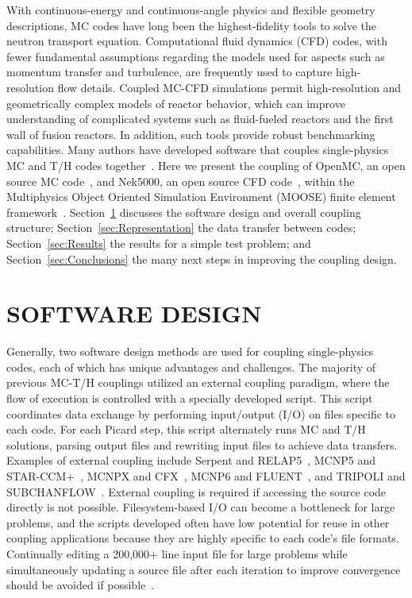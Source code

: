 \documentclass[letterpaper]{physor2018}
\begin{document}
With continuous-energy and continuous-angle physics and flexible geometry descriptions, MC
codes have long been the highest-fidelity tools to solve the neutron transport
equation. Computational fluid dynamics (CFD) codes, with fewer fundamental
assumptions regarding the models used for aspects such as momentum transfer and
turbulence, are frequently used to capture high-resolution flow details.
Coupled MC-CFD simulations permit high-resolution and geometrically complex
models of reactor behavior, which can improve understanding of complicated
systems such as fluid-fueled reactors and the first wall of fusion reactors. In
addition, such tools provide robust benchmarking capabilities.  Many authors
have developed software that couples single-physics MC and T/H codes
together~\cite{Wu,Seker,Cardoni,Breitkreutz,Sjenitzer,Gurecky,Ivanov,Daeubler,Aufiero,Gill}. Here we
present the coupling of OpenMC, an open source MC code~\cite{Romano}, and
Nek5000, an open source CFD code~\cite{Fischer}, within the Multiphysics Object Oriented
Simulation Environment (MOOSE) finite element framework~\cite{Gaston}.
Section~\ref{sec:first} discusses the software design and overall coupling
structure; Section~\ref{sec:Representation} the data transfer between codes;
Section~\ref{sec:Results} the results for a simple test problem; and
Section~\ref{sec:Conclusions} the many next steps in improving the coupling
design.

\section{SOFTWARE DESIGN}
\label{sec:first}

Generally, two software design methods are used for coupling single-physics codes,
each of which has unique advantages and challenges.
The majority of previous MC-T/H couplings utilized
an external coupling paradigm, where the flow of execution is controlled with a specially developed script.
This script coordinates data exchange by performing input/output (I/O) on files specific to each code.
For each Picard step, this script alternately runs MC and T/H solutions,
parsing output files and rewriting input files to achieve data transfers.
Examples of external coupling include
Serpent and RELAP5~\cite{Wu}, MCNP5 and STAR-CCM+~\cite{Cardoni},
MCNPX and CFX~\cite{Breitkreutz}, MCNP6 and FLUENT~\cite{Gurecky}, and
TRIPOLI and SUBCHANFLOW~\cite{Sjenitzer}.
External coupling is required if accessing the source code directly is not possible.
Filesystem-based I/O can become a bottleneck for large problems,
and the scripts developed often have low potential for reuse in other coupling applications
because they are highly specific to each code's file formats.
Continually editing a 200,000\(+\) line input file for large
problems while simultaneously updating a source file after each iteration to improve convergence
should be avoided if possible~\cite{Ivanov}.
\end{document}
